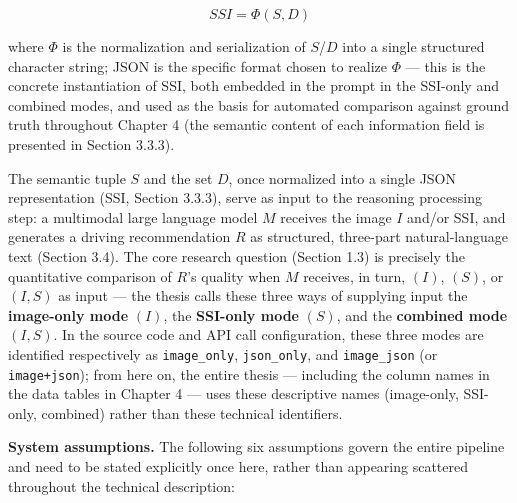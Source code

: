 \documentclass[12pt,a4paper]{report}
\begin{document}
\[
SSI = \Phi(S, D)
\]

where $\Phi$ is the normalization and serialization of $S$/$D$ into a single structured character string; JSON is the specific format chosen to realize $\Phi$ --- this is the concrete instantiation of SSI, both embedded in the prompt in the SSI-only and combined modes, and used as the basis for automated comparison against ground truth throughout Chapter 4 (the semantic content of each information field is presented in Section 3.3.3).

The semantic tuple $S$ and the set $D$, once normalized into a single JSON representation (SSI, Section 3.3.3), serve as input to the reasoning processing step: a multimodal large language model $M$ receives the image $I$ and/or SSI, and generates a driving recommendation $R$ as structured, three-part natural-language text (Section 3.4). The core research question (Section 1.3) is precisely the quantitative comparison of $R$'s quality when $M$ receives, in turn, $(I)$, $(S)$, or $(I, S)$ as input --- the thesis calls these three ways of supplying input the \textbf{image-only mode} $(I)$, the \textbf{SSI-only mode} $(S)$, and the \textbf{combined mode} $(I,S)$. In the source code and API call configuration, these three modes are identified respectively as \texttt{image\_only}, \texttt{json\_only}, and \texttt{image\_json} (or \texttt{image+json}); from here on, the entire thesis --- including the column names in the data tables in Chapter 4 --- uses these descriptive names (image-only, SSI-only, combined) rather than these technical identifiers.

\textbf{System assumptions.} The following six assumptions govern the entire pipeline and need to be stated explicitly once here, rather than appearing scattered throughout the technical description:
\end{document}
